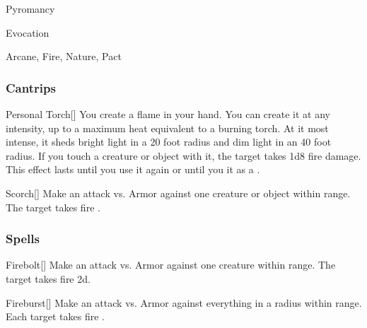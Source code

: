 \newpage
\begin{spellsection}{Pyromancy}

\begin{spellheader}
\end{spellheader}


 Evocation

 Arcane, Fire, Nature, Pact

\subsubsection{Cantrips}


\begin{freeability}{Personal Torch}[]
You create a flame in your hand.
You can create it at any intensity, up to a maximum heat equivalent to a burning torch.
At it most intense, it sheds bright light in a 20 foot radius and dim light in an 40 foot radius.
If you touch a creature or object with it, the target takes 1d8 fire damage.
This effect lasts until you use it again or until you  it as a .
\end{freeability}


\begin{freeability}{Scorch}[]
Make an attack vs. Armor against one creature or object within \rngmed range.
\hit The target takes fire .
\end{freeability}

\end{spellsection}


\subsubsection{Spells}


\lowercase{\hypertarget{spell:Firebolt}{}}\label{spell:Firebolt}
\begin{apability}[\nth{1}]{\hypertarget{spell:Firebolt}{Firebolt}}[]
Make an attack vs. Armor against one creature within \rngmed range.
\hit The target takes fire  \plus2d.
\end{apability}
\vspace{0.25em}



\lowercase{\hypertarget{spell:Fireburst}{}}\label{spell:Fireburst}
\begin{apability}[\nth{1}]{\hypertarget{spell:Fireburst}{Fireburst}}[]
Make an attack vs. Armor against everything in a \areasmall radius within \rngmed range.
\hit Each target takes fire .
\end{apability}
\vspace{0.25em}



